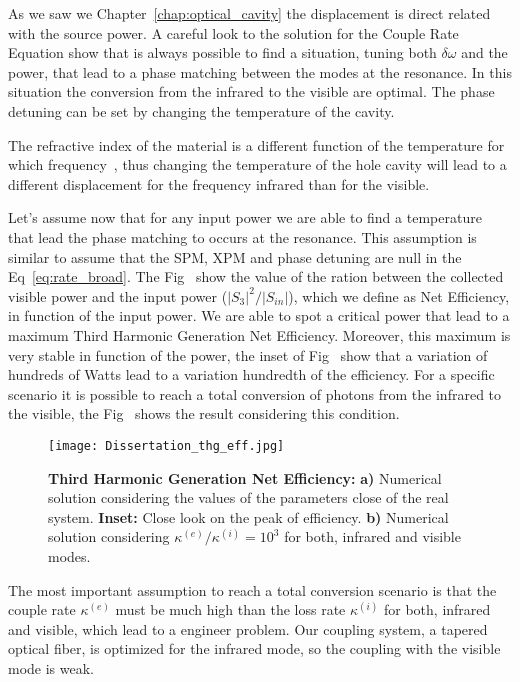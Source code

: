 As we saw we Chapter~\ref{chap:optical_cavity} the displacement is direct related with the source power. A careful look to the solution for the Couple Rate Equation show that is always possible to find a situation, tuning both $\delta\omega$ and the power, that lead to a phase matching between the modes at the resonance. In this situation the conversion from the infrared to the visible are optimal. The phase detuning can be set by changing the temperature of the cavity. 

The refractive index of the material is a different function of the temperature for which frequency~\needcit, thus changing the temperature of the hole cavity will lead to a different displacement for the frequency infrared than for the visible. 

Let's assume now that for any input power we are able to find a temperature that lead the phase matching to occurs at the resonance. This assumption is similar to assume that the SPM, XPM and phase detuning are null in the Eq~\ref{eq:rate_broad}. The Fig~
show the value of the ration between the collected visible power and the input power ($|S_3|^2/|S_{in}|$), which we define as Net Efficiency, in function of the input power. We are able to spot a critical power that lead to a maximum Third Harmonic Generation Net Efficiency. Moreover, this maximum is very stable in function of the power, the inset of Fig~ show that a variation of hundreds of Watts lead to a variation hundredth of the efficiency. For a specific scenario it is possible to reach a total conversion of photons from the infrared to the visible, the Fig~ shows the result considering this condition. 

\begin{figure}[h]
    \centering
    \texttt{[image: Dissertation\_thg\_eff.jpg]}
    \caption{\textbf{Third Harmonic Generation Net Efficiency:} \textbf{a)} Numerical solution considering the values of the parameters close of the real system. \textbf{Inset:} Close look on the peak of efficiency. \textbf{b)} Numerical solution considering $\kappa^{(e)}/\kappa^{(i)} = 10^3$ for both, infrared and visible modes.}  
    \label{fig:power_solution}
\end{figure}

The most important assumption to reach a total conversion scenario is that the couple rate $\kappa^{(e)}$ must be much high than the loss rate $\kappa^{(i)}$ for both, infrared and visible, which lead to a engineer problem. Our coupling system, a tapered optical fiber, is optimized for the infrared mode, so the coupling with the visible mode is weak.


